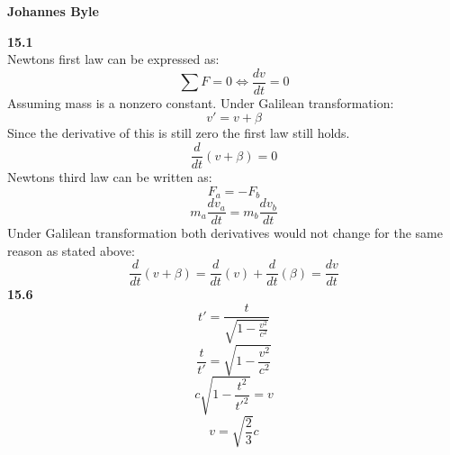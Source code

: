 \documentclass[english]{article}
\begin{document}
\begin{multicols*}{2}
\textbf{Johannes Byle}\\
\newcommand{\Lagr}{\mathcal{L}}

\noindent
\textbf{15.1}\\
Newtons first law can be expressed as:
$$\sum F=0\Leftrightarrow\frac{dv}{dt}=0$$
Assuming mass is a nonzero constant.
Under Galilean transformation:
$$v'=v+\beta$$
Since the derivative of this is still zero the first law still holds.
$$\frac{d}{dt}(v+\beta)=0$$
Newtons third law can be written as:
$$F_a=-F_b$$
$$m_a\frac{dv_a}{dt}=m_b\frac{dv_b}{dt}$$
Under Galilean transformation both derivatives would not change for the same reason as stated above:
$$\frac{d}{dt}(v+\beta)=\frac{d}{dt}(v)+\frac{d}{dt}(\beta)=\frac{dv}{dt}$$
\noindent
\textbf{15.6}\\
$$t'=\frac{t}{\sqrt{1-\frac{v^2}{c^2}}}$$
$$\frac{t}{t'}=\sqrt{1-\frac{v^2}{c^2}}$$
$$c\sqrt{1-\frac{t^2}{t'^2}}=v$$
$$v=\sqrt{\frac{2}{3}}c$$
\end{multicols*}
\end{document}

